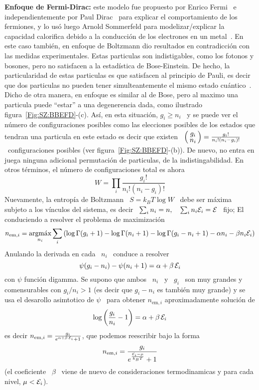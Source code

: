 {\begin{ejemplo}
  {\bf  Enfoque   de  Fermi-Dirac:}  este   modelo  fue  propuesto   por  Enrico
  Fermi~\cite{Fer26, Fer26:2}  e independientemente por  Paul Dirac~\cite{Dir26}
  para  explicar el comportamiento  de los  fermiones, y  lo us\'o  luego Arnold
  Sommerfeld  para  modelizar/explicar  la  capacidad  calorifica  debido  a  la
  conducci\'on  de  los  electrones  en  un metal~\cite{Som27}.   En  este  caso
  tambi\'en, en enfoque  de Boltzmann dio resultados en  contradicci\'on con las
  medidas experimentales.  Estas particulas  son indistigables, como los fotonos
  y bosones, pero no satisfacen  a la estad\'istica de Bose-Einstein.  De hecho,
  la particularidad de estas particulas es que satisfacen al principio de Pauli,
  es decir que  dos particulas no pueden tener  simulteantemente el mismo estado
  cu\'antico~\cite[Cap.~3]{Mer18}. Dicho  de otra manera, en  enfoque es similar
  al de  Bose, pero al maximo  una particula puede ``estar''  a una degenerencia
  dada,   como   ilustrado   figura~\ref{Fig:SZ:BBEFD}-(c).   As\'i,   en   esta
  situaci\'on, $g_i  \ge n_i$ \  y se puede  ver el n\'umero  de configuraciones
  posibles como las elecciones posibles de los estados que tendran una particula
  en  este estado  es decir  que existen  \ $\bino{g_i}{n_i}  = \frac{g_i!}{n_i!
    (n_i-g_i)!}$ \ configuraciones posibles (ver figura~\ref{Fig:SZ:BBEFD}-(b)).
  De nuevo, no entra en  juega ninguna adicional permutaci\'on de particulas, de
  la  indistingabilidad. En  otros  t\'erminos, el  n\'umero de  configuraciones
  total es ahora
  \[
  W = \prod_i \frac{g_i!}{n_i! (n_i - g_i)!}
  \]
  Nuevamente,  la entrop\'ia  de Boltzmann  \ $S  =  k_B T  \log W$  \ debe  ser
  m\'axima subjeto  a los v\'inculos  del sistema, es  decir \ $\sum_i n_i  = n,
  \quad \sum_i n_i \mathcal{E}_i  = \mathcal{E}$ \ fijo; El conduciendo a  resolver el problema de
  maximizaci\'on
  \[  
  n_{\mathrm{em},i}  =   \operatorname*{argm\acute{a}x}_{n_i}  \sum_i  \left(  \log   \Gamma(g_i  +  1)
    - \log \Gamma(n_i  + 1) - \log  \Gamma(g_i - n_i +  1) - \alpha n_i  - \beta
    n_i \mathcal{E}_i \right) \]
  Anulando la derivada en cada \ $n_i$ \ conduce a resolver
  \[
  \psi(g_i - n_i) - \psi(n_i+1) = \alpha + \beta \, \mathcal{E}_i
  \]
  con $\psi$ funci\'on digamma.   Se supono que ambos \ $n_i$ \ y  \ $g_i$ \ son
  muy  grandes y  comensurables con  $g_i/n_i >  1$ (es  decir que  $g_i-n_i$ es
  tambi\'en   muy    grande)   y   se    usa   el   desarollo    asimtotico   de
  $\psi$~\cite[6.3.18]{AbrSte70}      para      obtener      $n_{\mathrm{em},i}$
  aproximadamente soluci\'on de
  \[
  \log\left( \frac{g_i}{n_i} - 1 \right) = \alpha + \beta \, \mathcal{E}_i
  \]
  es decir $n_{\mathrm{em},i} = \frac{g_i}{e^{\alpha + \beta \, \mathcal{E}_i} + 1}$, que
  podemos reescribir bajo la forma
  \[
  n_{\mathrm{em},i} = \frac{g_i}{e^{\frac{\mathcal{E}_i - \mu}{k_B T}} + 1}
  \]
  (el coeficiente \ $\beta$ \ viene de nuevo de consideraciones termodinamicas y
  para cada nivel, $\mu < \mathcal{E}_i$).  


\end{ejemplo}}
